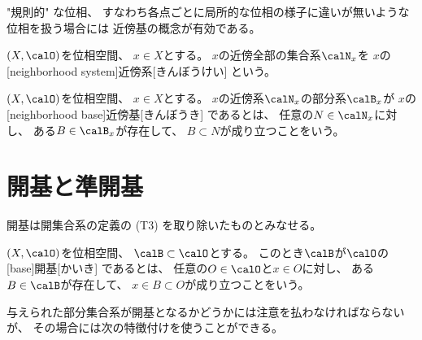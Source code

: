\documentclass[report]{jlreq}
\begin{document}
"規則的" な位相、
すなわち各点ごとに局所的な位相の様子に違いが無いような位相を扱う場合には
近傍基の概念が有効である。

\begin{definition}[近傍]
    \TODO{}
\end{definition}

\begin{definition}[近傍系]
    $(X, \calO)$を位相空間、
    $x \in X$とする。
    $x$の近傍全部の集合系$\calN_x$を
    $x$の[neighborhood system]{近傍系}[きんぼうけい]
    という。
\end{definition}

\begin{definition}[近傍基]
    $(X, \calO)$を位相空間、
    $x \in X$とする。
    $x$の近傍系$\calN_x$の部分系$\calB_x$が
    $x$の[neighborhood base]{近傍基}[きんぼうき]
    であるとは、
    任意の$N \in \calN_x$に対し、
    ある$B \in \calB_x$が存在して、
    $B \subset N$が成り立つことをいう。
\end{definition}


\begin{definition}[第1可算]
    \TODO{}
\end{definition}

%
\section{開基と準開基}

開基は開集合系の定義の (T3) を取り除いたものとみなせる。

\begin{definition}[開基]
    $(X, \calO)$を位相空間、
    $\calB \subset \calO$とする。
    このとき$\calB$が$\calO$の
    [base]{開基}[かいき]
    であるとは、
    任意の$O \in \calO$と$x \in O$に対し、
    ある$B \in \calB$が存在して、
    $x \in B \subset O$が成り立つことをいう。
\end{definition}

与えられた部分集合系が開基となるかどうかには注意を払わなければならないが、
その場合には次の特徴付けを使うことができる。

\begin{proposition}[開基の特徴付け]
    \label[proposition]{prop:open-base-characterization}
    \TODO{}
\end{proposition}
\end{document}
